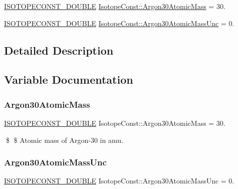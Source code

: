 \begin{DoxyCompactItemize}
\item 
\mbox{\hyperlink{group___isotope_const-_macros_ga8f45a7272ce02c0b4c65c44636ed719a}{I\+S\+O\+T\+O\+P\+E\+C\+O\+N\+S\+T\+\_\+\+D\+O\+U\+B\+LE}} \mbox{\hyperlink{group___isotope_const-_argon-_ar30_ga8d2401144f036e17021878d3c83f3bbe}{Isotope\+Const\+::\+Argon30\+Atomic\+Mass}} = 30.
\item 
\mbox{\hyperlink{group___isotope_const-_macros_ga8f45a7272ce02c0b4c65c44636ed719a}{I\+S\+O\+T\+O\+P\+E\+C\+O\+N\+S\+T\+\_\+\+D\+O\+U\+B\+LE}} \mbox{\hyperlink{group___isotope_const-_argon-_ar30_gac938afbe603d835a78a609d2e111c9c8}{Isotope\+Const\+::\+Argon30\+Atomic\+Mass\+Unc}} = 0.
\end{DoxyCompactItemize}


\subsection{Detailed Description}


\subsection{Variable Documentation}
\mbox{\label{group___isotope_const-_argon-_ar30_ga8d2401144f036e17021878d3c83f3bbe}} 
\subsubsection{\texorpdfstring{Argon30\+Atomic\+Mass}{Argon30AtomicMass}}
{\footnotesize\ttfamily \mbox{\hyperlink{group___isotope_const-_macros_ga8f45a7272ce02c0b4c65c44636ed719a}{I\+S\+O\+T\+O\+P\+E\+C\+O\+N\+S\+T\+\_\+\+D\+O\+U\+B\+LE}} Isotope\+Const\+::\+Argon30\+Atomic\+Mass = 30.}

\$ \$ Atomic mass of Argon-\/30 in amu. \mbox{\label{group___isotope_const-_argon-_ar30_gac938afbe603d835a78a609d2e111c9c8}} 
\subsubsection{\texorpdfstring{Argon30\+Atomic\+Mass\+Unc}{Argon30AtomicMassUnc}}
{\footnotesize\ttfamily \mbox{\hyperlink{group___isotope_const-_macros_ga8f45a7272ce02c0b4c65c44636ed719a}{I\+S\+O\+T\+O\+P\+E\+C\+O\+N\+S\+T\+\_\+\+D\+O\+U\+B\+LE}} Isotope\+Const\+::\+Argon30\+Atomic\+Mass\+Unc = 0.}

